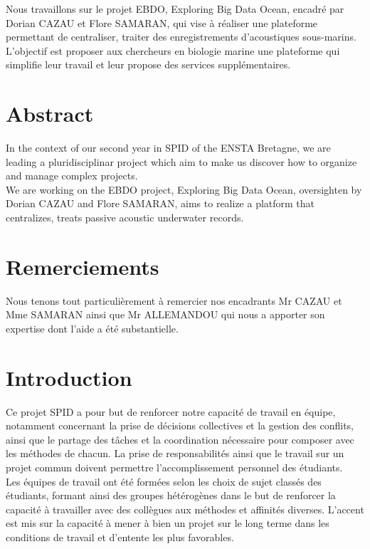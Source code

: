 \documentclass[a4paper]{article}
\begin{document}
Nous travaillons sur le projet EBDO, Exploring Big Data Ocean, encadré par Dorian
CAZAU et Flore SAMARAN, qui vise à réaliser une plateforme permettant de centraliser, traiter
des enregistrements d’acoustiques sous-marins. L’objectif est proposer aux chercheurs en
biologie marine une plateforme qui simplifie leur travail et leur propose des services
supplémentaires.

\section{Abstract}

In the context of our second year in SPID of the ENSTA Bretagne, we are leading a
pluridisciplinar project which aim to make us discover how to organize and manage complex
projects.
\\

We are working on the EBDO project, Exploring Big Data Ocean, oversighten by Dorian
CAZAU and Flore SAMARAN, aims to realize a platform that centralizes, treats passive acoustic
underwater records.

\section{Remerciements}

Nous tenons tout particulièrement à remercier nos encadrants Mr CAZAU et Mme SAMARAN
ainsi que Mr ALLEMANDOU qui nous a apporter son expertise dont l’aide a été substantielle.

\section{Introduction}

Ce projet SPID a pour but de renforcer notre capacité de travail en équipe, notamment
concernant la prise de décisions collectives et la gestion des conflits, ainsi que le partage des
tâches et la coordination nécessaire pour composer avec les méthodes de chacun. La prise de
responsabilités ainsi que le travail sur un projet commun doivent permettre l’accomplissement
personnel des étudiants.
\\

Les équipes de travail ont été formées selon les choix de sujet classés des étudiants,
formant ainsi des groupes hétérogènes dans le but de renforcer la capacité à travailler avec des
collègues aux méthodes et affinités diverses. L’accent est mis sur la capacité à mener à bien un
projet sur le long terme dans les conditions de travail et d’entente les plus favorables.
\\
\end{document}
